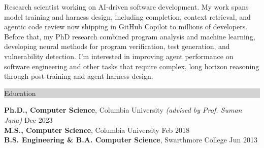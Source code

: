 \documentclass{article} %
\newcommand{\rsection}[1]{
  \hspace{-0.4cm}\vspace{0.1cm}
\colorbox{lightgrey}{
\begin{minipage}{1.07\linewidth}
\vspace{0.22cm}
\fontsize{14pt}{16pt}\selectfont #1
\vspace{0.12cm}
\end{minipage}
}
\par\nopagebreak %
}
\newcommand{\rjob}[2]{
  \hspace*{-0.3cm}
{\fontsize{10pt}{12pt}\selectfont #1} \hfill #2
\hspace*{-1.2cm}
}
\begin{document}
\begin{minipage}{\linewidth}
Research scientist working on AI-driven software development. My work spans model training and harness design, including completion, context retrieval, and agentic code review now shipping in GitHub Copilot to millions of developers. 
Before that, my PhD research combined program analysis and machine learning, developing neural methods for program verification, test generation, and vulnerability detection.
I'm interested in improving agent performance on software engineering and other tasks that require complex, long horizon reasoning through post-training and agent harness design.
\end{minipage}
\vspace{0.15cm}

\rsection{Education}

\rjob{\textbf{Ph.D., Computer Science}, Columbia University \textit{(advised by Prof. Suman Jana)}}{Dec 2023}\\
\rjob{\textbf{M.S., Computer Science}, Columbia University}{Feb 2018}\\
\rjob{\textbf{B.S. Engineering \& B.A. Computer Science}, Swarthmore College}{Jun 2013}\\
\vspace{-0.05cm}
\end{document}
